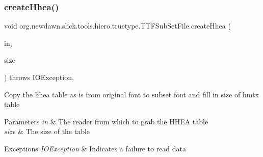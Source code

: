 \mbox{\label{classorg_1_1newdawn_1_1slick_1_1tools_1_1hiero_1_1truetype_1_1_t_t_f_sub_set_file_ad1f5466a315f2f689b310f1651953f6b}} 
\subsubsection{\texorpdfstring{create\+Hhea()}{createHhea()}}
{\footnotesize\ttfamily void org.\+newdawn.\+slick.\+tools.\+hiero.\+truetype.\+T\+T\+F\+Sub\+Set\+File.\+create\+Hhea (\begin{DoxyParamCaption}\item[{\mbox{\hyperlink{classorg_1_1newdawn_1_1slick_1_1tools_1_1hiero_1_1truetype_1_1_font_file_reader}{Font\+File\+Reader}}}]{in,  }\item[{int}]{size }\end{DoxyParamCaption}) throws I\+O\+Exception\hspace{0.3cm}{\ttfamily [inline]}, {\ttfamily [private]}}

Copy the hhea table as is from original font to subset font and fill in size of hmtx table


\begin{DoxyParams}{Parameters}
{\em in} & The reader from which to grab the H\+H\+EA table \\
\hline
{\em size} & The size of the table \\
\hline
\end{DoxyParams}

\begin{DoxyExceptions}{Exceptions}
{\em I\+O\+Exception} & Indicates a failure to read data \\
\hline
\end{DoxyExceptions}

